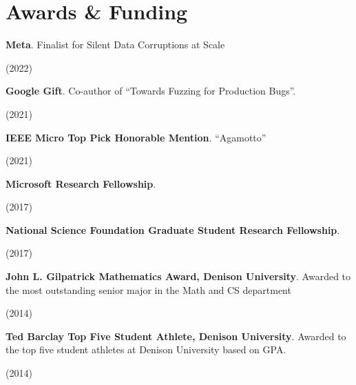 \documentclass[letterpaper,10pt]{article}
\newcommand{\sidebyside}[2]{
  \begin{minipage}[t]{.75\textwidth}
    \raggedright{}
    #2
  \end{minipage}
  \hspace{.01\textwidth}
    \begin{minipage}[t]{.205\textwidth}
    \raggedleft
    #1
  \end{minipage}
}
\newcommand{\trio}[3]{\sidebyside{#3}{\textbf{#1}. #2}}
\begin{document}
\section{Awards \& Funding}
\begin{smenumerate}
\item \trio{Meta}{Finalist for Silent Data Corruptions at Scale}{(2022)}
\item \trio{Google Gift}{Co-author of ``Towards Fuzzing for Production Bugs''.}{(2021)}
\item \trio{IEEE Micro Top Pick Honorable Mention}{``Agamotto''}{(2021)}
\item \trio{Microsoft Research Fellowship}{}{(2017)}
\item \trio{National Science Foundation Graduate Student Research
  Fellowship}{}{(2017)}
\item \trio{John L. Gilpatrick Mathematics Award, Denison University}{Awarded to
  the most outstanding senior major in the Math and CS department}{(2014)}
\item \trio{Ted Barclay Top Five Student Athlete, Denison University}{Awarded to
  the top five student athletes at Denison University based on GPA.}{(2014)}
\end{smenumerate}


\end{document}
